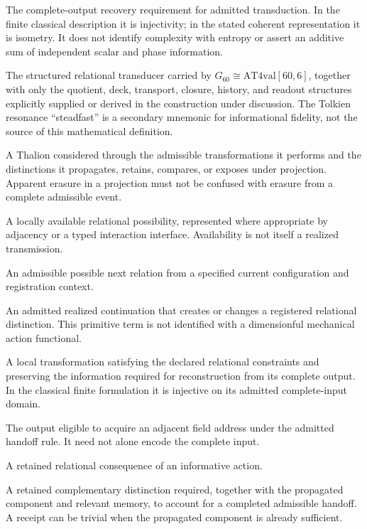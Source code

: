 \begin{description}[style=nextline,leftmargin=1.5em,font=\normalfont\bfseries]
\item[Thalean conservation of information]
The complete-output recovery requirement for admitted transduction. In the finite classical description it is injectivity; in the stated coherent representation it is isometry. It does not identify complexity with entropy or assert an additive sum of independent scalar and phase information.
\item[Thalion]
The structured relational transducer carried by $G_{60}\cong\mathrm{AT4val}[60,6]$, together with only the quotient, deck, transport, closure, history, and readout structures explicitly supplied or derived in the construction under discussion.
The Tolkien resonance ``steadfast'' is a secondary mnemonic for informational fidelity, not the source of this mathematical definition.
\item[Thalean transducer]
A Thalion considered through the admissible transformations it performs and the distinctions it propagates, retains, compares, or exposes under projection. Apparent erasure in a projection must not be confused with erasure from a complete admissible event.
\item[Relation]
A locally available relational possibility, represented where appropriate by adjacency or a typed interaction interface. Availability is not itself a realized transmission.
\item[Continuation]
An admissible possible next relation from a specified current configuration and registration context.
\item[Informative action]
An admitted realized continuation that creates or changes a registered relational distinction. This primitive term is not identified with a dimensionful mechanical action functional.
\item[Admissible transduction]
A local transformation satisfying the declared relational constraints and preserving the information required for reconstruction from its complete output. In the classical finite formulation it is injective on its admitted complete-input domain.
\item[Propagated component]
The output eligible to acquire an adjacent field address under the admitted handoff rule. It need not alone encode the complete input.
\item[Trace]
A retained relational consequence of an informative action.
\item[Receipt]
A retained complementary distinction required, together with the propagated component and relevant memory, to account for a completed admissible handoff. A receipt can be trivial when the propagated component is already sufficient.

\end{description}
